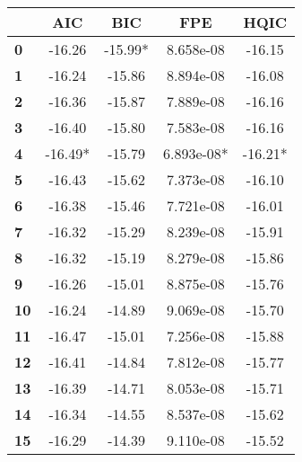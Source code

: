 \begin{center}
\begin{tabular}{lcccc}
\toprule
            & \textbf{AIC} & \textbf{BIC} & \textbf{FPE} & \textbf{HQIC}  \\
\midrule
\textbf{0}  &      -16.26  &     -15.99*  &   8.658e-08  &       -16.15   \\
\textbf{1}  &      -16.24  &      -15.86  &   8.894e-08  &       -16.08   \\
\textbf{2}  &      -16.36  &      -15.87  &   7.889e-08  &       -16.16   \\
\textbf{3}  &      -16.40  &      -15.80  &   7.583e-08  &       -16.16   \\
\textbf{4}  &     -16.49*  &      -15.79  &  6.893e-08*  &      -16.21*   \\
\textbf{5}  &      -16.43  &      -15.62  &   7.373e-08  &       -16.10   \\
\textbf{6}  &      -16.38  &      -15.46  &   7.721e-08  &       -16.01   \\
\textbf{7}  &      -16.32  &      -15.29  &   8.239e-08  &       -15.91   \\
\textbf{8}  &      -16.32  &      -15.19  &   8.279e-08  &       -15.86   \\
\textbf{9}  &      -16.26  &      -15.01  &   8.875e-08  &       -15.76   \\
\textbf{10} &      -16.24  &      -14.89  &   9.069e-08  &       -15.70   \\
\textbf{11} &      -16.47  &      -15.01  &   7.256e-08  &       -15.88   \\
\textbf{12} &      -16.41  &      -14.84  &   7.812e-08  &       -15.77   \\
\textbf{13} &      -16.39  &      -14.71  &   8.053e-08  &       -15.71   \\
\textbf{14} &      -16.34  &      -14.55  &   8.537e-08  &       -15.62   \\
\textbf{15} &      -16.29  &      -14.39  &   9.110e-08  &       -15.52   \\
\bottomrule
\end{tabular}
\end{center}